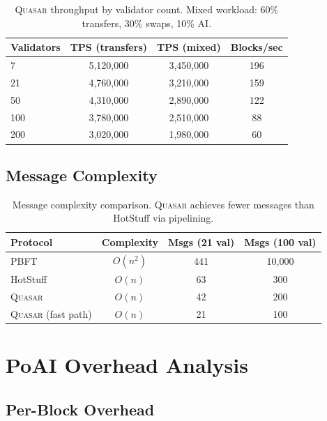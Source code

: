 \documentclass[11pt,letterpaper]{article}
\newcommand{\Quasar}{\textsc{Quasar}}
\begin{document}
\begin{table}[t]
\centering
\begin{tabular}{lccc}
\toprule
\textbf{Validators} & \textbf{TPS (transfers)} & \textbf{TPS (mixed)} & \textbf{Blocks/sec} \\
\midrule
7 & 5,120,000 & 3,450,000 & 196 \\
21 & 4,760,000 & 3,210,000 & 159 \\
50 & 4,310,000 & 2,890,000 & 122 \\
100 & 3,780,000 & 2,510,000 & 88 \\
200 & 3,020,000 & 1,980,000 & 60 \\
\bottomrule
\end{tabular}
\caption{\Quasar{} throughput by validator count. Mixed workload: 60\% transfers, 30\% swaps, 10\% AI.}
\label{tab:throughput}
\end{table}

\subsection{Message Complexity}

\begin{table}[t]
\centering
\begin{tabular}{lccc}
\toprule
\textbf{Protocol} & \textbf{Complexity} & \textbf{Msgs (21 val)} & \textbf{Msgs (100 val)} \\
\midrule
PBFT & $O(n^2)$ & 441 & 10,000 \\
HotStuff & $O(n)$ & 63 & 300 \\
\Quasar{} & $O(n)$ & 42 & 200 \\
\Quasar{} (fast path) & $O(n)$ & 21 & 100 \\
\bottomrule
\end{tabular}
\caption{Message complexity comparison. \Quasar{} achieves fewer messages than HotStuff via pipelining.}
\label{tab:messages}
\end{table}

\section{PoAI Overhead Analysis}
\label{sec:poai-overhead}

\subsection{Per-Block Overhead}
\end{document}
